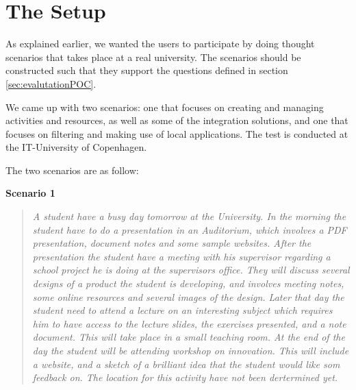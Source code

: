 \section{The Setup}
As explained earlier, we wanted the users to participate by doing thought scenarios that takes place at a real university. The scenarios should be constructed such that they support the questions defined in section \ref{sec:evalutationPOC}.

We came up with two scenarios: one that focuses on creating and managing activities and resources, as well as some of the integration solutions, and one that focuses on filtering and making use of local applications. The test is conducted at the IT-University of Copenhagen.

The two scenarios are as follow:
\par\vspace{\baselineskip}

\textbf{Scenario 1}
\begin{quotation}
\emph{
A student have a busy day tomorrow at the University. In the morning the student have to do a presentation in an Auditorium, which involves a PDF presentation, document notes and some sample websites. After the presentation the student have a meeting with his supervisor regarding a school project he is doing at the supervisors office. They will discuss several designs of a product the student is developing, and involves meeting notes, some online resources and several images of the design. Later that day the student need to attend a lecture on an interesting subject which requires him to have access to the lecture slides, the exercises presented, and a note document. This will take place in a small teaching room. At the end of the day the student will be attending workshop on innovation. This will include a website, and a sketch of a brilliant idea that the student would like som feedback on. The location for this activity have not been dertermined yet.
}
\end{quotation}

